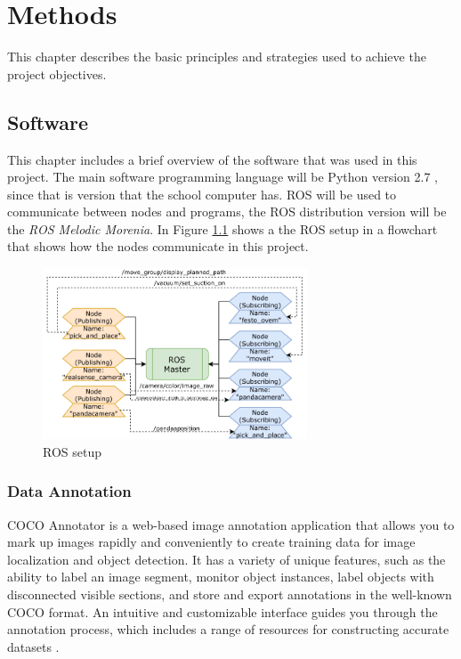 \chapter{Methods}
This chapter describes the basic principles and strategies used to achieve the project objectives. 
\section{Software}

This chapter includes a brief overview of the software that was used in this project. The main software programming language will be Python version 2.7 \cite{noauthor_python_nodate}, since that is version that the school computer has. ROS will be used to communicate between nodes and programs, the ROS distribution version will be the \textit{ROS Melodic Morenia}\cite{noauthor_melodic_nodate}. In Figure \ref{fig:roswork} shows a the ROS setup in a flowchart that shows how the nodes communicate in this project.
\begin{figure}[h]
    \centering
    \includegraphics[width=0.7\textwidth]{graphics/ros.pdf}
    \caption{ROS setup}
    \label{fig:roswork}
\end{figure}


\subsection{Data Annotation}
COCO Annotator is a web-based image annotation application that allows you to mark up images rapidly and conveniently to create training data for image localization and object detection. It has a variety of unique features, such as the ability to label an image segment, monitor object instances, label objects with disconnected visible sections, and store and export annotations in the well-known COCO format. An intuitive and customizable interface guides you through the annotation process, which includes a range of resources for constructing accurate datasets \cite{brooks_jsbrokscoco-annotator_2021}.


